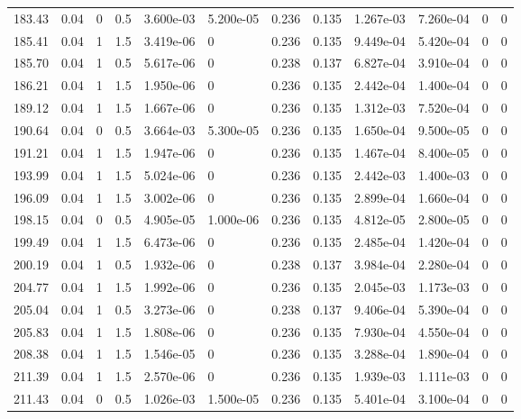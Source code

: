 \documentclass[preview]{standalone}
\begin{document}
{{{\begin{tabular}{L{1.2cm}C{1.2cm} C{0.3cm}C{0.5cm} C{1.4cm}C{1.4cm} C{1.4cm}C{1.4cm} C{1.6cm}C{1.6cm} C{1.6cm}C{1.6cm}}
  183.43  &  0.04  & 0     & 0.5 &  3.600e-03  & 5.200e-05  &  0.236&   0.135& 1.267e-03 & 7.260e-04   &  0 & 0  \\ 
  185.41  &  0.04  & 1     & 1.5 &  3.419e-06  & 0  &  0.236&   0.135& 9.449e-04 & 5.420e-04   &  0 & 0  \\ 
  185.70  &  0.04  & 1     & 0.5 &  5.617e-06  & 0  &  0.238&   0.137& 6.827e-04 & 3.910e-04   &  0 & 0  \\ 
  186.21  &  0.04  & 1     & 1.5 &  1.950e-06  & 0  &  0.236&   0.135& 2.442e-04 & 1.400e-04   &  0 & 0  \\ 
  189.12  &  0.04  & 1     & 1.5 &  1.667e-06  & 0  &  0.236&   0.135& 1.312e-03 & 7.520e-04   &  0 & 0  \\ 
  190.64  &  0.04  & 0     & 0.5 &  3.664e-03  & 5.300e-05  &  0.236&   0.135& 1.650e-04 & 9.500e-05   &  0 & 0  \\ 
  191.21  &  0.04  & 1     & 1.5 &  1.947e-06  & 0  &  0.236&   0.135& 1.467e-04 & 8.400e-05   &  0 & 0  \\ 
  193.99  &  0.04  & 1     & 1.5 &  5.024e-06  & 0  &  0.236&   0.135& 2.442e-03 & 1.400e-03   &  0 & 0  \\ 
  196.09  &  0.04  & 1     & 1.5 &  3.002e-06  & 0  &  0.236&   0.135& 2.899e-04 & 1.660e-04   &  0 & 0  \\ 
  198.15  &  0.04  & 0     & 0.5 &  4.905e-05  & 1.000e-06  &  0.236&   0.135& 4.812e-05 & 2.800e-05   &  0 & 0  \\ 
  199.49  &  0.04  & 1     & 1.5 &  6.473e-06  & 0  &  0.236&   0.135& 2.485e-04 & 1.420e-04   &  0 & 0  \\ 
  200.19  &  0.04  & 1     & 0.5 &  1.932e-06  & 0  &  0.238&   0.137& 3.984e-04 & 2.280e-04   &  0 & 0  \\ 
  204.77  &  0.04  & 1     & 1.5 &  1.992e-06  & 0  &  0.236&   0.135& 2.045e-03 & 1.173e-03   &  0 & 0  \\ 
  205.04  &  0.04  & 1     & 0.5 &  3.273e-06  & 0  &  0.238&   0.137& 9.406e-04 & 5.390e-04   &  0 & 0  \\ 
  205.83  &  0.04  & 1     & 1.5 &  1.808e-06  & 0  &  0.236&   0.135& 7.930e-04 & 4.550e-04   &  0 & 0  \\ 
  208.38  &  0.04  & 1     & 1.5 &  1.546e-05  & 0  &  0.236&   0.135& 3.288e-04 & 1.890e-04   &  0 & 0  \\ 
  211.39  &  0.04  & 1     & 1.5 &  2.570e-06  & 0  &  0.236&   0.135& 1.939e-03 & 1.111e-03   &  0 & 0  \\ 
  211.43  &  0.04  & 0     & 0.5 &  1.026e-03  & 1.500e-05  &  0.236&   0.135& 5.401e-04 & 3.100e-04   &  0 & 0  \\ 

\end{tabular}}}}
\end{document}
